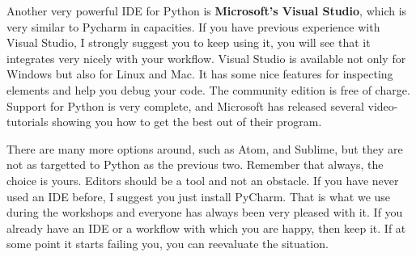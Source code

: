 Another very powerful IDE for Python is \textbf{Microsoft’s Visual Studio}, which is very similar to Pycharm in capacities. If you have previous experience with Visual Studio, I strongly suggest you to keep using it, you will see that it integrates very nicely with your workflow. Visual Studio is available not only for Windows but also for Linux and Mac. It has some nice features for inspecting elements and help you debug your code. The community edition is free of charge. Support for Python is very complete, and Microsoft has released several video-tutorials showing you how to get the best out of their program. 

There are many more options around, such as Atom, and Sublime, but they are not as targetted to Python as the previous two. Remember that always, the choice is yours. Editors should be a tool and not an obstacle. If you have never used an IDE before, I suggest you just install PyCharm. That is what we use during the workshops and everyone has always been very pleased with it. If you already have an IDE or a workflow with which you are happy, then keep it. If at some point it starts failing you, you can reevaluate the situation.  

